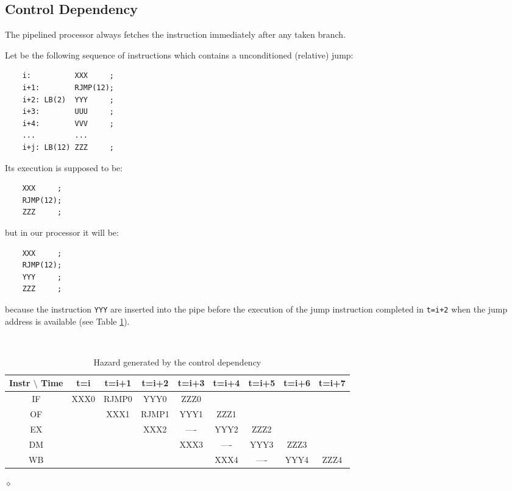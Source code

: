 \subsection{Control Dependency}

The pipelined processor always fetches the instruction immediately after any taken branch.

\begin{exemplu}\label{controlDep}
Let be the following sequence of instructions which contains a unconditioned (relative) jump:
\begin{verbatim}
    i:          XXX     ;
    i+1:        RJMP(12);
    i+2: LB(2)  YYY     ;
    i+3:        UUU     ;
    i+4:        VVV     ;
    ...         ...
    i+j: LB(12) ZZZ     ;
\end{verbatim}
Its execution is supposed to be:
\begin{verbatim}
    XXX     ;
    RJMP(12);
    ZZZ     ;
\end{verbatim}
but in our processor it will be:
\begin{verbatim}
    XXX     ;
    RJMP(12);
    YYY     ;
    ZZZ     ;
\end{verbatim}
because the instruction {\tt YYY} are inserted into the pipe before the execution of the jump instruction completed in {\tt t=i+2} when the jump address is available  (see Table \ref{contrDep}).

\begin{table}[H]
  \begin{center}
    \caption{Hazard generated by the control dependency}
    \label{contrDep}
    {\small
    {\tt
    \begin{tabular}{|c||c|c|c|c|c|c|c|c|}
      \hline
     Instr $\setminus$ Time & t=i  & t=i+1 & t=i+2 & t=i+3 & t=i+4 & t=i+5 & t=i+6 & t=i+7  \\ \hline \hline
        IF                  & XXX0 & RJMP0 & YYY0  & ZZZ0  &       &       &       &        \\ \hline
        OF                  &      & XXX1  & RJMP1 & YYY1  & ZZZ1  &       &       &        \\ \hline
        EX                  &      &       & XXX2  & ---- & YYY2   & ZZZ2  &       &        \\ \hline
        DM                  &       &       &      & XXX3  & ----  & YYY3  & ZZZ3  &        \\ \hline
        WB                  &      &       &       &       & XXX4  & ----  & YYY4  & ZZZ4   \\ \hline
    \end{tabular}
    }
    }
  \end{center}
\end{table}

$\diamond$
\end{exemplu}


